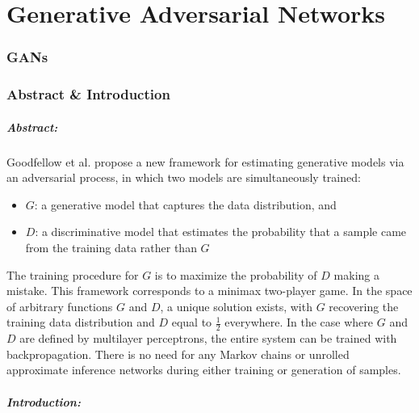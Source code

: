 \chapter{Generative Adversarial Networks}



\subsection{GANs \cite{goodfellow2014generative}}

\subsection*{Abstract \& Introduction}

\paragraph*{Abstract: } Goodfellow et al. propose a new framework for estimating generative models via an adversarial process, in which two models are simultaneously trained:
\begin{itemize}
\item
	$G$: a generative model that captures the data distribution, and
\item
	$D$: a discriminative model that estimates the probability that a sample came from the training data rather than $G$
\end{itemize}
The training procedure for $G$ is to maximize the probability of $D$ making a mistake. This framework corresponds to a minimax two-player game. In the space of arbitrary functions $G$ and $D$, a unique solution exists, with $G$ recovering the training data distribution and $D$ equal to $\frac{1}{2}$ everywhere. In the case where $G$ and $D$ are defined by multilayer perceptrons, the entire system can be trained with backpropagation. There is no need for any Markov chains or unrolled approximate inference networks during either training or generation of samples.


\paragraph*{Introduction: }


